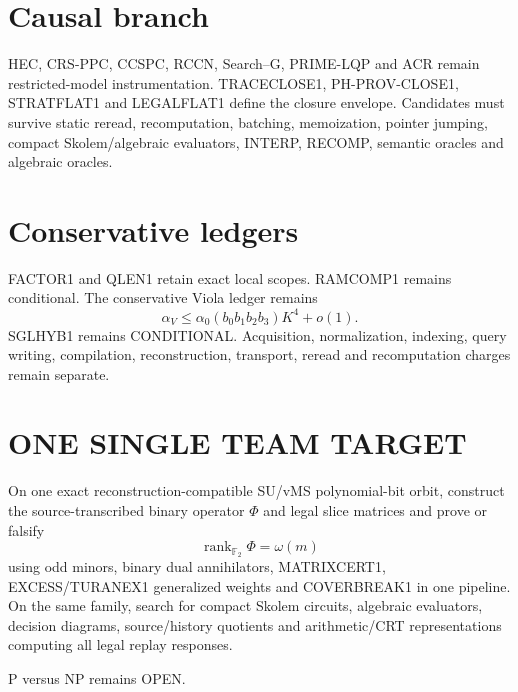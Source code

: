 \documentclass[11pt]{article}
\begin{document}
\section*{Causal branch}
HEC, CRS-PPC, CCSPC, RCCN, Search--G, PRIME-LQP and ACR remain restricted-model instrumentation. TRACECLOSE1, PH-PROV-CLOSE1, STRATFLAT1 and LEGALFLAT1 define the closure envelope. Candidates must survive static reread, recomputation, batching, memoization, pointer jumping, compact Skolem/algebraic evaluators, INTERP, RECOMP, semantic oracles and algebraic oracles.

\section*{Conservative ledgers}
FACTOR1 and QLEN1 retain exact local scopes. RAMCOMP1 remains conditional. The conservative Viola ledger remains
\[
\alpha_V\le\alpha_0(b_0b_1b_2b_3)K^4+o(1).
\]
SGLHYB1 remains CONDITIONAL. Acquisition, normalization, indexing, query writing, compilation, reconstruction, transport, reread and recomputation charges remain separate.

\section*{ONE SINGLE TEAM TARGET}
On one exact reconstruction-compatible SU/vMS polynomial-bit orbit, construct the source-transcribed binary operator \(\Phi\) and legal slice matrices and prove or falsify
\[
\boxed{\operatorname{rank}_{\mathbb F_2}\Phi=\omega(m)}
\]
using odd minors, binary dual annihilators, MATRIXCERT1, EXCESS/TURANEX1 generalized weights and COVERBREAK1 in one pipeline. On the same family, search for compact Skolem circuits, algebraic evaluators, decision diagrams, source/history quotients and arithmetic/CRT representations computing all legal replay responses.

P versus NP remains OPEN.
\end{document}
